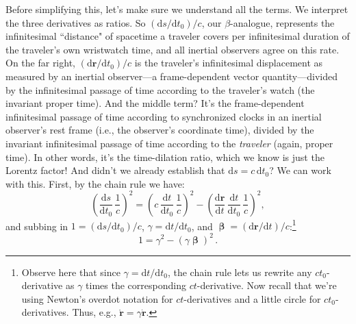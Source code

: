 \documentclass[12pt]{article}
\renewcommand{\vv}[1]{\mathbf{#1}}
\newcommand{\dd}[1]{\mathrm{d}#1}
\newcommand{\vvbeta}{\bm{\upbeta}}
\begin{document}
Before simplifying this, let's make sure we understand all the terms. We interpret the three derivatives as ratios. So $(\dd s/\dd t_0)/c$, our $\beta$-analogue, represents the infinitesimal ``distance" of spacetime a traveler covers per infinitesimal duration of the traveler's own wristwatch time, and all inertial observers agree on this rate. On the far right, $(\dd \vv r/\dd t_0)/c$ is the traveler's infinitesimal displacement as measured by an inertial observer---a frame-dependent vector quantity---divided by the infinitesimal passage of time according to the traveler's watch (the invariant proper time). And the middle term? It's the frame-dependent infinitesimal passage of time according to synchronized clocks in an inertial observer's rest frame (i.e., the observer's coordinate time), divided by the invariant infinitesimal passage of time according to the \emph{traveler} (again, proper time). In other words, it's the time-dilation ratio, which we know is just the Lorentz factor! And didn't we already establish that $\dd s = c \, \dd t_0$? We can work with this. First, by the chain rule we have:
\begin{equation*}
\left(\dfrac{\dd s}{\dd t_0} \, \dfrac{1}{c} \right)^2 = \left(c \, \dfrac{\dd t}{\dd t_0} \, \dfrac{1}{c}\right)^2 - \left(\dfrac{\dd \vv r}{\dd t} \, \dfrac{\dd t}{\dd t_0} \, \frac{1}{c} \right)^2,
\end{equation*}
and subbing in $1 = (\dd s / \dd t_0)/c$, $\gamma = \dd t / \dd t_0$, and $\vvbeta = (\dd \vv r / \dd t)/c$:\footnote{\label{fn:cr}Observe here that since $\gamma = \dd t / \dd t_0$, the chain rule lets us rewrite any $c t_0$-derivative as $\gamma$ times the corresponding $ct$-derivative. Now recall that we're using Newton's overdot notation for $ct$-derivatives and a little circle for $c t_0$-derivatives. Thus, e.g., $\mathring{\vv r} = \gamma \dot{\vv r}$.}
\begin{equation}\label{eq:25}
\boxed{1 = \gamma^2 - \left(\gamma \vvbeta \right)^2} \, .
\end{equation}
\end{document}
